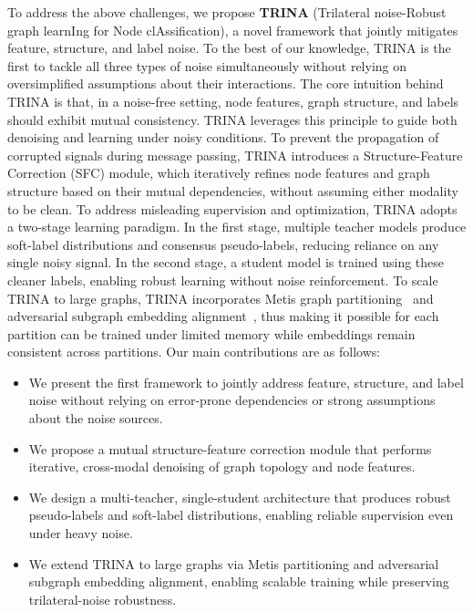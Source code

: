 \documentclass[sigconf, anonymous, review]{acmart}
\begin{document}
  To address the above challenges, we propose \textbf{TRINA} (Trilateral noise-Robust graph learnIng for Node clAssification), a novel framework that jointly mitigates feature, structure, and label noise. To the best of our knowledge, TRINA is the first to tackle all three types of noise simultaneously without relying on oversimplified assumptions about their interactions.
  The core intuition behind TRINA is that, in a noise-free setting, node features, graph structure, and labels should exhibit mutual consistency. TRINA leverages this principle to guide both denoising and learning under noisy conditions.
  To prevent the propagation of corrupted signals during message passing, TRINA introduces a Structure-Feature Correction (SFC) module, which iteratively refines node features and graph structure based on their mutual dependencies, without assuming either modality to be clean. 
  To address misleading supervision and optimization, TRINA adopts a two-stage learning paradigm. In the first stage, multiple teacher models produce soft-label distributions and consensus pseudo-labels, reducing reliance on any single noisy signal. In the second stage, a student model is trained using these cleaner labels, enabling robust learning without noise reinforcement.
  To scale TRINA to large graphs, TRINA incorporates Metis graph partitioning~\cite{karypis1998fast} and adversarial subgraph embedding alignment~\cite{ganin2015unsupervised}, thus making it possible for each partition can be trained under limited memory while embeddings remain consistent across partitions.
  Our main contributions are as follows:
  \begin{itemize}
    \item We present the first framework to jointly address feature, structure, and label noise without relying on error-prone dependencies or strong assumptions about the noise sources.
    \item We propose a mutual structure-feature correction module that performs iterative, cross-modal denoising of graph topology and node features.
    \item We design a multi-teacher, single-student architecture that produces robust pseudo-labels and soft-label distributions, enabling reliable supervision even under heavy noise.
    \item We extend TRINA to large graphs via Metis partitioning and adversarial subgraph embedding alignment, enabling scalable training while preserving trilateral-noise robustness.
  \end{itemize}
\end{document}
